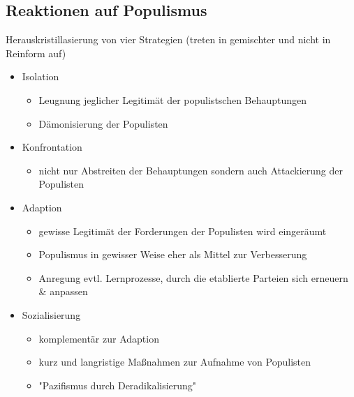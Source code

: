 \documentclass[11pt]{article}
\begin{document}
\subsection{Reaktionen auf Populismus}
\label{sec:orgaf487ea}
Herauskristillasierung von vier Strategien (treten in gemischter und nicht in Reinform auf)
\begin{itemize}
\item Isolation
\begin{itemize}
\item Leugnung jeglicher Legitimät der populistschen Behauptungen
\item Dämonisierung der Populisten
\end{itemize}
\item Konfrontation
\begin{itemize}
\item nicht nur Abstreiten der Behauptungen sondern auch Attackierung der Populisten
\end{itemize}
\item Adaption
\begin{itemize}
\item gewisse Legitimät der Forderungen der Populisten wird eingeräumt
\item Populismus in gewisser Weise eher als Mittel zur Verbesserung
\item Anregung evtl. Lernprozesse, durch die etablierte Parteien sich erneuern \& anpassen
\end{itemize}
\item Sozialisierung
\begin{itemize}
\item komplementär zur Adaption
\item kurz und langristige Maßnahmen zur Aufnahme von Populisten
\item "Pazifismus durch Deradikalisierung"
\end{itemize}
\end{itemize}
\end{document}
